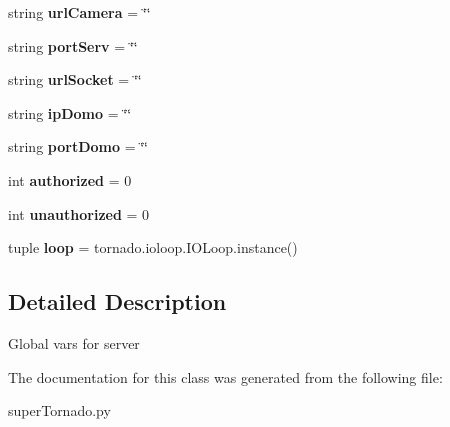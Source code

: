 \begin{DoxyCompactItemize}
\item 
\hypertarget{classsuper_tornado_1_1_global_vars_af9c579f7873a30bd5ee9d3547fea1ecd}{string {\bfseries url\-Camera} = \char`\"{}\char`\"{}}\label{classsuper_tornado_1_1_global_vars_af9c579f7873a30bd5ee9d3547fea1ecd}

\item 
\hypertarget{classsuper_tornado_1_1_global_vars_a46b35cd7e739aad2f78100e5c44be95a}{string {\bfseries port\-Serv} = \char`\"{}\char`\"{}}\label{classsuper_tornado_1_1_global_vars_a46b35cd7e739aad2f78100e5c44be95a}

\item 
\hypertarget{classsuper_tornado_1_1_global_vars_a198024d11aabe49f4cced6f8c92f2557}{string {\bfseries url\-Socket} = \char`\"{}\char`\"{}}\label{classsuper_tornado_1_1_global_vars_a198024d11aabe49f4cced6f8c92f2557}

\item 
\hypertarget{classsuper_tornado_1_1_global_vars_a5d938abea96eeb8ba2506a5630852151}{string {\bfseries ip\-Domo} = \char`\"{}\char`\"{}}\label{classsuper_tornado_1_1_global_vars_a5d938abea96eeb8ba2506a5630852151}

\item 
\hypertarget{classsuper_tornado_1_1_global_vars_af6421d020adaaef6fe34eda225be7ad8}{string {\bfseries port\-Domo} = \char`\"{}\char`\"{}}\label{classsuper_tornado_1_1_global_vars_af6421d020adaaef6fe34eda225be7ad8}

\item 
\hypertarget{classsuper_tornado_1_1_global_vars_a53190e11b952863f655e2a8637b4d9b0}{int {\bfseries authorized} = 0}\label{classsuper_tornado_1_1_global_vars_a53190e11b952863f655e2a8637b4d9b0}

\item 
\hypertarget{classsuper_tornado_1_1_global_vars_ace59d34b127bace56dd6db537a5134a1}{int {\bfseries unauthorized} = 0}\label{classsuper_tornado_1_1_global_vars_ace59d34b127bace56dd6db537a5134a1}

\item 
\hypertarget{classsuper_tornado_1_1_global_vars_a19bf135e50433c4c306b59ee9186346a}{tuple {\bfseries loop} = tornado.\-ioloop.\-I\-O\-Loop.\-instance()}\label{classsuper_tornado_1_1_global_vars_a19bf135e50433c4c306b59ee9186346a}

\end{DoxyCompactItemize}


\subsection{Detailed Description}
\begin{DoxyVerb}Global vars for server
\end{DoxyVerb}
 

The documentation for this class was generated from the following file\-:\begin{DoxyCompactItemize}
\item 
super\-Tornado.\-py\end{DoxyCompactItemize}
